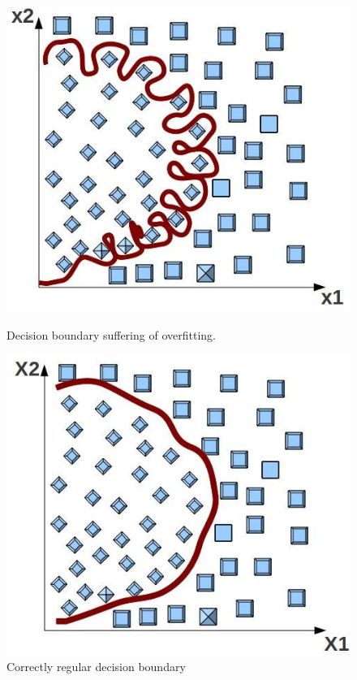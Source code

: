 \documentclass[aps,letterpaper,10pt]{revtex4}
\begin{document}
\begin{figure}[]
  \includegraphics[width=\linewidth]{img/template_quadratic_region_overfitting.jpg}
  \caption{Decision boundary suffering of overfitting.}\label{fig:1}
\endminipage\hfill
{}
  \includegraphics[width=\linewidth]{img/template_quadratic_region_just_right.jpg}
  \caption{Correctly regular decision boundary}\label{fig:2}
\endminipage\hfill

\end{figure}
\end{document}
